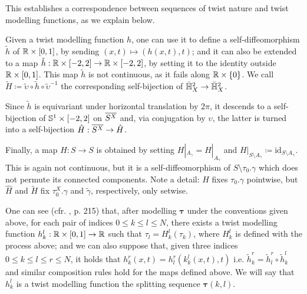 \begin{rmk}
This establishes a correspondence between sequences of twist nature and twist modelling functions, as we explain below.

Given a twist modelling function $h$, one can use it to define a self-diffeomorphism $\tilde h$ of $\mathbb R\times[0,1]$, by sending $(x,t)\mapsto(h(x,t),t)$; and it can also be extended to a map $\tilde h:\mathbb R\times [-2,2]\rightarrow \mathbb R\times [-2,2]$, by setting it to the identity outside $\mathbb R\times[0,1]$. This map $\tilde h$ is not continuous, as it fails along $\mathbb R\times \{0\}$. We call $\tilde H\coloneqq \tilde\upsilon\circ \tilde h \circ\tilde\upsilon^{-1}$ the corresponding self-bijection of $\bar{\mathbb H}^2_X\rightarrow \bar{\mathbb H}^2_X$.

Since $\tilde h$ is equivariant under horizontal translation by $2\pi$, it descends to a self-bijection of $\mathbb S^1\times[-2,2]$ on $\overline{S^X}$ and, via conjugation by $\upsilon$, the latter is turned into a self-bijection $\hat H:\overline{S^X}\rightarrow \hat H$.

Finally, a map $H:S\rightarrow S$ is obtained by setting $H|_{A_\gamma}=\hat H|_{A_\gamma}$ and $H|_{S\setminus A_\gamma}\coloneqq \mathrm{id}_{S\setminus A_\gamma}$. This is again not continuous, but it is a self-diffeomorphism of $S\setminus \tau_0.\gamma$ which does not permute its connected components. Note a detail: $H$ fixes $\tau_0.\gamma$ pointwise, but $\hat H$ and $\tilde H$ fix $\tau_0^X.\gamma$ and $\tilde\gamma$, respectively, only setwise.

One can see (cfr. \cite{mosher}, p. 215) that, after modelling $\bm\tau$ under the conventions given above, for each pair of indices $0\leq k\leq l\leq N$, there exists a twist modelling function $h_k^l:\mathbb R\times[0,1]\rightarrow \mathbb R$ such that $\tau_l= H_k^l(\tau_k)$, where $H_k^l$ is defined with the process above; and we can also suppose that, given three indices $0\leq k\leq l \leq r \leq N$, it holds that $h_k^r(x,t)=h_l^r\left(k_k^l(x,t),t\right)$ i.e. $\tilde h_k^r=\tilde h_l^r\circ\tilde h_k^l$ and similar composition rules hold for the maps defined above. We will say that $h_k^l$ is a twist modelling function  the splitting sequence $\bm\tau(k,l)$.
\end{rmk}

